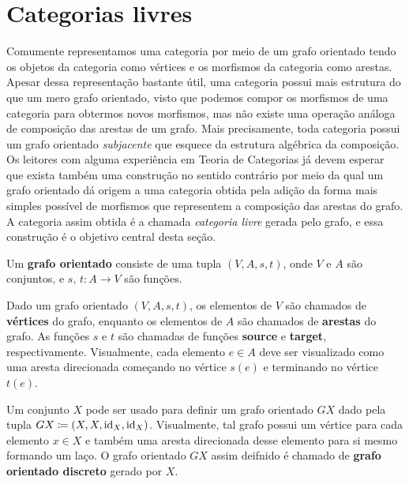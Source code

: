 \section{Categorias livres}

Comumente representamos uma categoria por meio de um grafo orientado tendo os objetos da categoria como vértices e os morfismos da categoria como arestas.
Apesar dessa representação bastante útil, uma categoria possui mais estrutura do que um mero grafo orientado, visto que podemos compor os morfismos de uma categoria para obtermos novos morfismos, mas não existe uma operação análoga de composição das arestas de um grafo.
Mais precisamente, toda categoria possui um grafo orientado \emph{subjacente} que esquece da estrutura algébrica da composição.
Os leitores com alguma experiência em Teoria de Categorias já devem esperar que exista também uma construção no sentido contrário por meio da qual um grafo orientado dá origem a uma categoria obtida pela adição da forma mais simples possível de morfismos que representem a composição das arestas do grafo.
A categoria assim obtida é a chamada \emph{categoria livre} gerada pelo grafo, e essa construção é o objetivo central desta seção.

\begin{defin}\label{defin:grafo_orientado}
    Um \textbf{grafo orientado} consiste de uma tupla $(V,A,s,t)$, onde $V$ e $A$ são conjuntos, e $s,\,t: A \to V$ são funções.
\end{defin}

Dado um grafo orientado $(V,A,s,t)$, os elementos de $V$ são chamados de \textbf{vértices} do grafo, enquanto os elementos de $A$ são chamados de \textbf{arestas} do grafo.
As funções $s$ e $t$ são chamadas de funções \textbf{source} e \textbf{target}, respectivamente.
Visualmente, cada elemento $e \in A$ deve ser visualizado como uma aresta direcionada começando no vértice $s(e)$ e terminando no vértice $t(e)$.

\begin{exem}\label{exem:grafo_orientado_discreto}
    Um conjunto $X$ pode ser usado para definir um grafo orientado $GX$ dado pela tupla $GX \coloneqq (X,X,\mathrm{id}_X,\mathrm{id}_X)$.
    Visualmente, tal grafo possui um vértice para cada elemento $x \in X$ e também uma aresta direcionada desse elemento para si mesmo formando um laço.
    O grafo orientado $GX$ assim deifnido é chamado de \textbf{grafo orientado discreto} gerado por $X$.
\end{exem}

